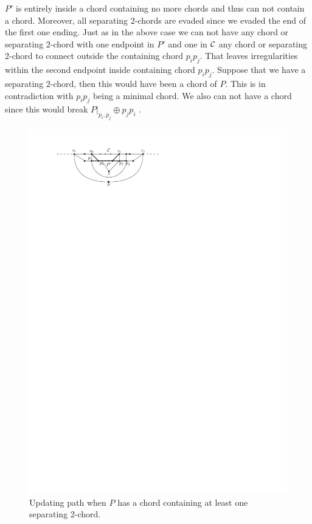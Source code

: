       $P'$ is entirely inside a chord containing no more chords and thus can not contain a chord. Moreover, all separating $2$-chords are evaded since we evaded the end of the first one ending.  Just as in the above case we can not have any chord or separating $2$-chord with one endpoint in $P'$ and one in $\mathcal{C}$ any chord or separating 2-chord to connect outside the containing chord $p_i p_j$.
      That leaves irregularities within the second endpoint inside containing chord $p_i p_j$. %
      Suppose that we have a separating $2$-chord, then this would have been a chord of $P$. This is in contradiction with $p_i p_j$ being a minimal chord.
      We also can not have a chord since this would break $P|_{p_i, p_j} \oplus p_j p_i$ .

      \begin{figure}[h]
        \centering
        \includegraphics[scale=1]{unifiedAlgo/img/sweep/cases/2chordInChordUpdate}
        \caption{Updating path when $P$ has a chord containing at least one separating 2-chord.}
        \label{fig:sweep:2chordInChordUpdate}
      \end{figure}

